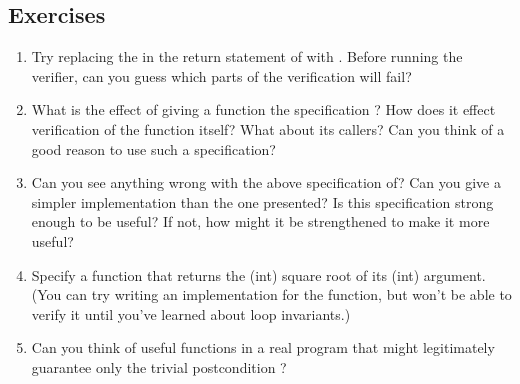 \subsection*{Exercises}
\begin{enumerate}
\item
Try replacing the \vcc{<} in the return statement of  with
\vcc{>}. Before running the verifier, can you guess which parts of the
verification will fail?

\item
What is the effect of giving a function the specification
 ? How does it effect verification of
the function itself? What about its callers? Can you think of a good 
reason to use such a specification?


\item
Can you see anything wrong with the above specification of?
Can you give a simpler implementation than the one presented? Is this 
specification strong enough to be useful? If not, how might it be
strengthened to make it more useful?

\item
Specify a function that returns the (int) square root of its (int)
argument. (You can try writing an implementation for the function, but
won't be able to verify it until you've learned about loop
invariants.)

\item
Can you think of useful functions in a real program that might
legitimately guarantee only the trivial postcondition ?
\end{enumerate}
